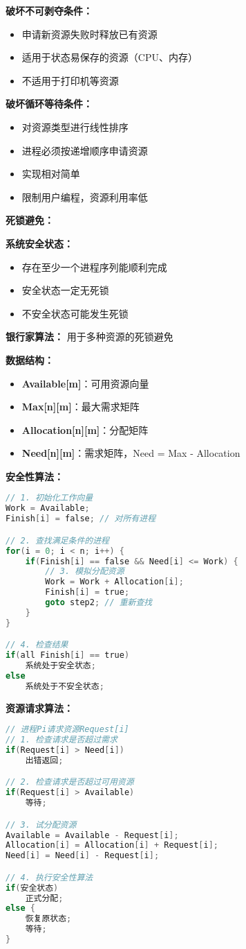 \documentclass[lang=cn,newtx,10pt,scheme=chinese]{../../elegantbook}
\begin{document}
\textbf{破坏不可剥夺条件：}
\begin{itemize}
  \item 申请新资源失败时释放已有资源
  \item 适用于状态易保存的资源（CPU、内存）
  \item 不适用于打印机等资源
\end{itemize}

\textbf{破坏循环等待条件：}
\begin{itemize}
  \item 对资源类型进行线性排序
  \item 进程必须按递增顺序申请资源
  \item 实现相对简单
  \item 限制用户编程，资源利用率低
\end{itemize}

\textbf{死锁避免：}

\textbf{系统安全状态：}
\begin{itemize}
  \item 存在至少一个进程序列能顺利完成
  \item 安全状态一定无死锁
  \item 不安全状态可能发生死锁
\end{itemize}

\textbf{银行家算法：}
用于多种资源的死锁避免

\textbf{数据结构：}
\begin{itemize}
  \item \textbf{Available[m]}：可用资源向量
  \item \textbf{Max[n][m]}：最大需求矩阵
  \item \textbf{Allocation[n][m]}：分配矩阵
  \item \textbf{Need[n][m]}：需求矩阵，Need = Max - Allocation
\end{itemize}

\textbf{安全性算法：}
\begin{lstlisting}[language=C]
// 1. 初始化工作向量
Work = Available;
Finish[i] = false; // 对所有进程

// 2. 查找满足条件的进程
for(i = 0; i < n; i++) {
    if(Finish[i] == false && Need[i] <= Work) {
        // 3. 模拟分配资源
        Work = Work + Allocation[i];
        Finish[i] = true;
        goto step2; // 重新查找
    }
}

// 4. 检查结果
if(all Finish[i] == true)
    系统处于安全状态;
else
    系统处于不安全状态;
\end{lstlisting}

\textbf{资源请求算法：}
\begin{lstlisting}[language=C]
// 进程Pi请求资源Request[i]
// 1. 检查请求是否超过需求
if(Request[i] > Need[i])
    出错返回;

// 2. 检查请求是否超过可用资源
if(Request[i] > Available)
    等待;

// 3. 试分配资源
Available = Available - Request[i];
Allocation[i] = Allocation[i] + Request[i];
Need[i] = Need[i] - Request[i];

// 4. 执行安全性算法
if(安全状态)
    正式分配;
else {
    恢复原状态;
    等待;
}
\end{lstlisting}
\end{document}
